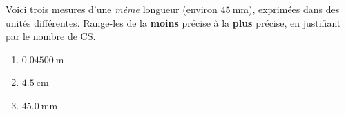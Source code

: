 \documentclass[11pt,a4paper]{article}
\begin{document}
\begin{exo}
Voici trois mesures d'une \emph{même} longueur (environ $\qty{45}{\milli\metre}$), exprimées dans des
unités différentes. Range-les de la \textbf{moins} précise à la \textbf{plus} précise, en justifiant
par le nombre de CS.
\begin{enumerate}[label=\alph*)]
  \item $\qty{0,04500}{\metre}$
  \item $\qty{4,5}{\centi\metre}$
  \item $\qty{45,0}{\milli\metre}$
\end{enumerate}
\end{exo}
\end{document}
